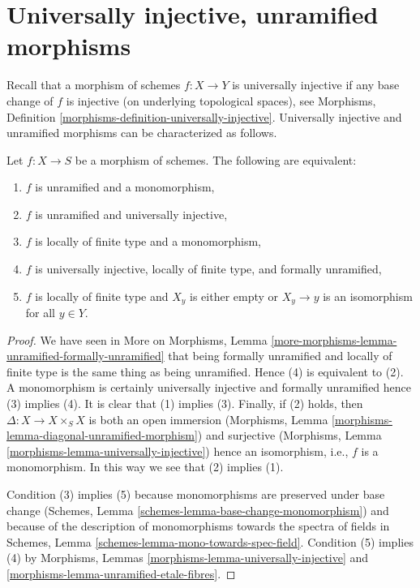 \section{Universally injective, unramified morphisms}
\label{section-universally-injective-unramified}

\noindent
Recall that a morphism of schemes $f : X \to Y$ is universally
injective if any base change of $f$ is injective (on underlying
topological spaces), see
Morphisms, Definition \ref{morphisms-definition-universally-injective}.
Universally injective and unramified morphisms can be
characterized as follows.

\begin{lemma}
\label{lemma-universally-injective-unramified}
Let $f : X \to S$ be a morphism of schemes.
The following are equivalent:
\begin{enumerate}
\item $f$ is unramified and a monomorphism,
\item $f$ is unramified and universally injective,
\item $f$ is locally of finite type and a monomorphism,
\item $f$ is universally injective, locally of finite type, and
formally unramified,
\item $f$ is locally of finite type and $X_y$ is either empty
or $X_y \to y$ is an isomorphism for all $y \in Y$.
\end{enumerate}
\end{lemma}

\begin{proof}
We have seen in
More on Morphisms, Lemma
\ref{more-morphisms-lemma-unramified-formally-unramified}
that being formally unramified and locally of finite type is the same thing
as being unramified. Hence (4) is equivalent to (2).
A monomorphism is certainly universally injective and
formally unramified hence (3) implies (4).
It is clear that (1) implies (3). Finally, if (2) holds, then
$\Delta : X \to X \times_S X$ is both an open immersion
(Morphisms, Lemma \ref{morphisms-lemma-diagonal-unramified-morphism})
and surjective
(Morphisms, Lemma \ref{morphisms-lemma-universally-injective})
hence an isomorphism, i.e., $f$ is a monomorphism. In this way we see that
(2) implies (1).

\medskip\noindent
Condition (3) implies (5) because monomorphisms are preserved under
base change
(Schemes, Lemma \ref{schemes-lemma-base-change-monomorphism})
and because of the description of monomorphisms towards the spectra of fields
in
Schemes, Lemma \ref{schemes-lemma-mono-towards-spec-field}.
Condition (5) implies (4) by
Morphisms, Lemmas \ref{morphisms-lemma-universally-injective} and
\ref{morphisms-lemma-unramified-etale-fibres}.
\end{proof}

